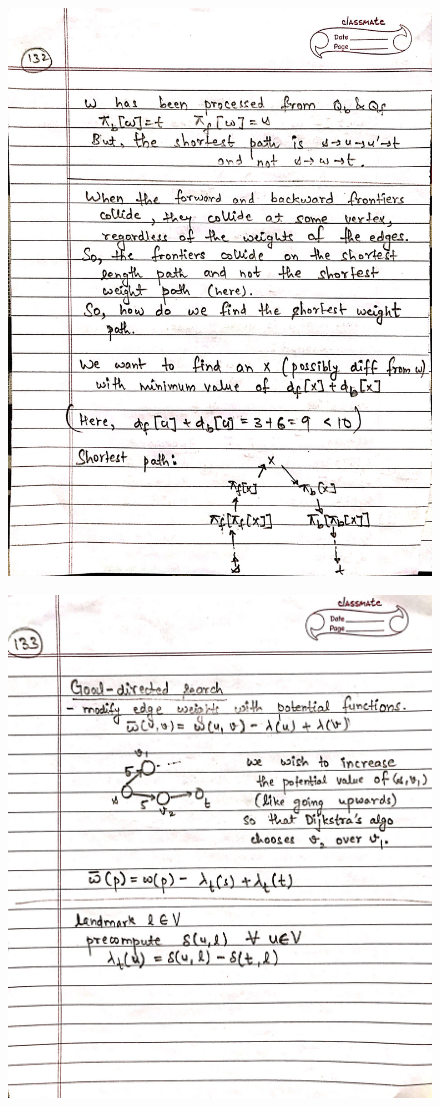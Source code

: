 \begin{figure}[H]
    \centering
    \includegraphics[scale=0.25]{"./MIT-6.006/MIT-6006-132"}
\end{figure}
\newpage
\begin{figure}[H]
    \centering
    \includegraphics[scale=0.25]{"./MIT-6.006/MIT-6006-133"}
\end{figure}
